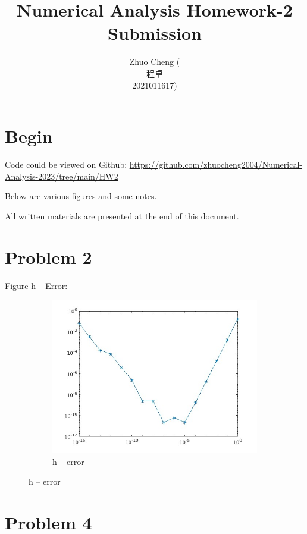 \documentclass{article}
\title{Numerical Analysis Homework-2 Submission}
\author{Zhuo Cheng (\begin{Chinese}程卓\end{Chinese}2021011617)}
\begin{document}
\maketitle

\section{Begin}

Code could be viewed on Github: 
\url{https://github.com/zhuocheng2004/Numerical-Analysis-2023/tree/main/HW2}

Below are various figures and some notes.

All written materials are presented at the end of this document.

\section{Problem 2}

Figure h -- Error:

\begin{figure}[H]
    \centering
    \begin{subfigure}[b]{0.8\linewidth}
	\includegraphics[width=\linewidth]{hw2_2_2.jpg}
        \caption{h -- error}
    \end{subfigure}
\end{figure}

\section{Problem 4}
\end{document}
